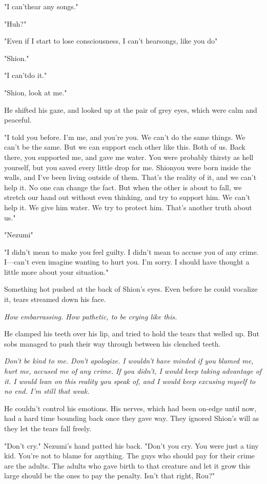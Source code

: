 "\el I can't\el hear any songs."

"Huh?"

"Even if I start to lose consciousness, I can't hear\el songs, like you
do\el "

"Shion."

"I can't\el do it."

"Shion, look at me."

He shifted his gaze, and looked up at the pair of grey eyes, which were
calm and peaceful.

"I told you before. I'm me, and you're you. We can't do the same things.
We can't be the same. But we can support each other like this. Both of
us. Back there, you supported me, and gave me water. You were probably
thirsty as hell yourself, but you saved every little drop for me.
Shion\el you were born inside the walls, and I've been living outside of
them. That's the reality of it, and we can't help it. No one can change
the fact. But when the other is about to fall, we stretch our hand out
without even thinking, and try to support him. We can't help it. We give
him water. We try to protect him. That's another truth about us."

"Nezumi\el "

"I didn't mean to make you feel guilty. I didn't mean to accuse you of
any crime. I---can't even imagine wanting to hurt you. I'm sorry. I should
have thought a little more about your situation."

Something hot pushed at the back of Shion's eyes. Even before he could
vocalize it, tears streamed down his face.

\emph{How embarrassing. How pathetic, to be crying like this.}

He clamped his teeth over his lip, and tried to hold the tears that
welled up. But sobs managed to push their way through between his
clenched teeth.

\emph{Don't be kind to me. Don't apologize. I wouldn't have minded if you
blamed me, hurt me, accused me of any crime. If you didn't, I would keep
taking advantage of it. I would lean on this reality you speak of, and I
would keep excusing myself to no end. I'm still that weak.}

He couldn't control his emotions. His nerves, which had been on-edge
until now, had a hard time bounding back once they gave way. They
ignored Shion's will as they let the tears fall freely.

"Don't cry." Nezumi's hand patted his back. "Don't you cry. You were
just a tiny kid. You're not to blame for anything. The guys who should
pay for their crime are the adults. The adults who gave birth to that
creature and let it grow this large should be the ones to pay the
penalty. Isn't that right, Rou?"

